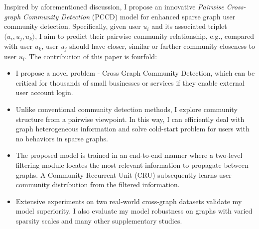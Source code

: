 Inspired by aforementioned discussion, I propose an innovative \textit{Pairwise Cross-graph Community Detection} (PCCD) model for enhanced sparse graph user community detection. Specifically, given user $u_i$ and its associated triplet $\langle u_{i},u_{j},u_{k}\rangle$, I aim to predict their pairwise community relationship, e.g., compared with user $u_{k}$, user $u_{j}$ should have closer, similar or farther community closeness to user $u_i$. The contribution of this paper is fourfold: 
\begin{itemize}
	\item I propose a novel problem - Cross Graph Community Detection, which can be critical for thousands of small businesses or services if they enable external user account login.
	
	\item Unlike conventional community detection methods, I explore community structure from a pairwise viewpoint. In this way, I can efficiently deal with graph heterogeneous information and solve cold-start problem for users with no behaviors in sparse graphs.
	
	\item The proposed model is trained in an end-to-end manner where a two-level filtering module locates the most relevant information to propagate between graphs. A Community Recurrent Unit (CRU) subsequently learns user community distribution from the filtered information.
	
	\item Extensive experiments on two real-world cross-graph datasets validate my model superiority. I also evaluate my model robustness on graphs with varied sparsity scales and many other supplementary studies.  
\end{itemize} 

